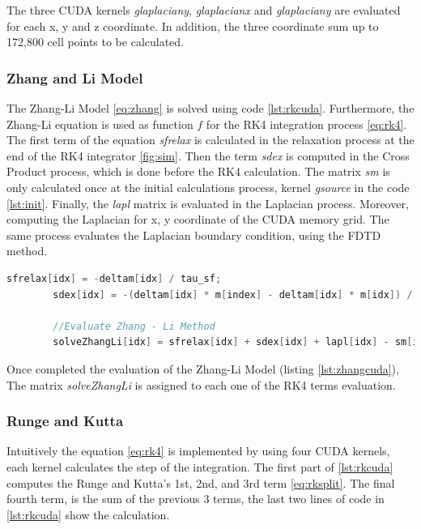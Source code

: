The three CUDA kernels \textit{glaplaciany}, \textit{glaplacianx} and \textit{glaplaciany} are evaluated for each x, y and z coordinate. In addition, the three coordinate sum up to 172,800 cell points to be calculated.

\subsubsection{Zhang and Li Model}

The Zhang-Li Model \ref{eq:zhang} is solved using code \ref{lst:rkcuda}. Furthermore, the Zhang-Li equation is used as function $f$ for the RK4 integration process \ref{eq:rk4}. The first term of the equation \textit{sfrelax} is calculated in the relaxation process at the end of the RK4 integrator \ref{fig:sim}. Then the term \textit{sdex} is computed in the Cross Product process, which is done before the RK4 calculation. The matrix \textit{sm} is only calculated once at the initial calculations process, kernel \textit{gsource} in the code \ref{lst:init}. Finally, the \textit{lapl} matrix is evaluated in the Laplacian process. Moreover, computing the Laplacian for x, y coordinate of the CUDA memory grid. The same process evaluates the Laplacian boundary condition, using the FDTD method.

\begin{lstlisting}[language=C++, label={lst:zhangcuda}, caption={Runge and Kutta 4th Terms}]
		sfrelax[idx] = -deltam[idx] / tau_sf;
		sdex[idx] = -(deltam[idx] * m[index] - deltam[idx] * m[idx]) / tau_sd;
		
		//Evaluate Zhang - Li Method
        solveZhangLi[idx] = sfrelax[idx] + sdex[idx] + lapl[idx] - sm[idx];
\end{lstlisting}

Once completed the evaluation of the Zhang-Li Model (listing \ref{lst:zhangcuda}), The matrix \textit{solveZhangLi} is assigned to each one of the RK4 terms evaluation.

\subsubsection{Runge and Kutta}
 
Intuitively the equation \ref{eq:rk4} is implemented by using four CUDA kernels, each kernel calculates the step of the integration. The first part of \ref{lst:rkcuda} computes the Runge and Kutta's 1st, 2nd, and 3rd  term \ref{eq:rksplit}. The final fourth term, is the sum of the previous 3 terms, the last two lines of code in \ref{lst:rkcuda} show the calculation.

